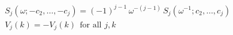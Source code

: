 \documentclass{article}
\begin{document}
\[
\begin{aligned}
&S_j(\omega;-c_2,\dots,-c_j)=(-1)^{j-1}\,\omega^{-(j-1)}\,S_j(\omega^{-1};c_2,\dots,c_j)\\
&V_j(k)=-V_j(k)\ \ \text{for all }j,k
\end{aligned}
\]
\end{document}
